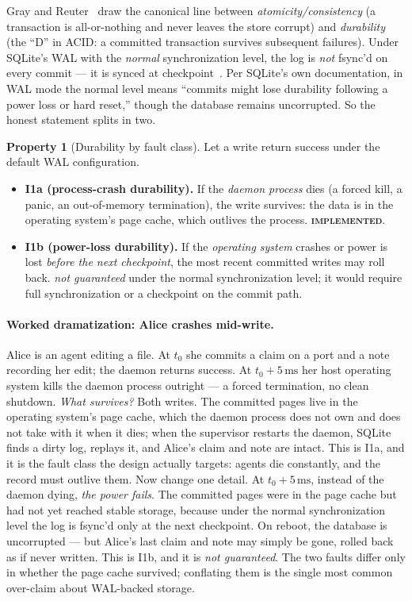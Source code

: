 \documentclass[11pt,a4paper]{article}
\newcommand{\Built}{{\textcolor{hhink}{\textsc{\textbf{implemented}}}}}
\newcommand{\NotGuar}{{\textcolor{hhink}{\textit{not guaranteed}}}}
\theoremstyle{definition}
\newtheorem{property}{Property}[section]
\theoremstyle{remark}
\begin{document}
Gray and Reuter~\cite{grayreuter1992} draw the canonical line between
\emph{atomicity/consistency} (a transaction is all-or-nothing and never leaves the
store corrupt) and \emph{durability} (the ``D'' in ACID: a committed transaction
survives subsequent failures). Under SQLite's WAL with the \emph{normal}
synchronization level, the log is \emph{not} fsync'd on every commit --- it is
synced at checkpoint~\cite{sqlitewal}. Per SQLite's own documentation, in WAL mode
the normal level means ``commits might lose durability following a power loss or
hard reset,'' though the database remains uncorrupted. So the honest statement
splits in two.

\begin{property}[Durability by fault class]\label{prop:durability}
Let a write return success under the default WAL configuration.
\begin{itemize}[leftmargin=1.4em]
  \item \textbf{I1a (process-crash durability).} If the \emph{daemon process}
  dies (a forced kill, a panic, an out-of-memory termination), the write survives:
  the data is in the operating system's page cache, which outlives the process.
  \Built.
  \item \textbf{I1b (power-loss durability).} If the \emph{operating system}
  crashes or power is lost \emph{before the next checkpoint}, the most recent
  committed writes may roll back. \NotGuar{} under the normal synchronization
  level; it would require full synchronization or a checkpoint on the commit path.
\end{itemize}
\end{property}

\paragraph{Worked dramatization: Alice crashes mid-write.}
Alice is an agent editing a file. At $t_0$ she commits a claim on a port and a
note recording her edit; the daemon returns success. At $t_0+5\,\mathrm{ms}$ her
host operating system kills the daemon process outright --- a forced termination,
no clean shutdown. \emph{What survives?} Both writes. The committed pages live in
the operating system's page cache, which the daemon process does not own and does
not take with it when it dies; when the supervisor restarts the daemon, SQLite
finds a dirty log, replays it, and Alice's claim and note are intact. This is I1a,
and it is the fault class the design actually targets: agents die constantly, and
the record must outlive them. Now change one detail. At $t_0+5\,\mathrm{ms}$,
instead of the daemon dying, \emph{the power fails}. The committed pages were in
the page cache but had not yet reached stable storage, because under the normal
synchronization level the log is fsync'd only at the next checkpoint. On reboot,
the database is uncorrupted --- but Alice's last claim and note may simply be gone,
rolled back as if never written. This is I1b, and it is \emph{not guaranteed}. The
two faults differ only in whether the page cache survived; conflating them is the
single most common over-claim about WAL-backed storage.
\end{document}
